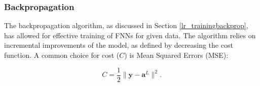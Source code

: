 \documentclass[a4paper,11pt,oneside]{article}
\theoremstyle{plain}
\theoremstyle{definition}
\begin{document}
	\subsubsection{Backpropagation}\label{imp_backprop}
	
	The backpropagation algorithm, as discussed in Section \ref{lr_trainingbackprop}, has allowed for effective training of FNNs for given data. The algorithm relies on incremental improvements of the model, as defined by decreasing the cost function. A common choice for cost ($C$) is Mean Squared Errors (MSE):
	
	\begin{equation}\label{func_MSE}
	{C} = \frac{1}{2} \rVert \mathbf{y} - \mathbf{a}^L \rVert^2 .
	\end{equation}
	~\\
	
\end{document}
